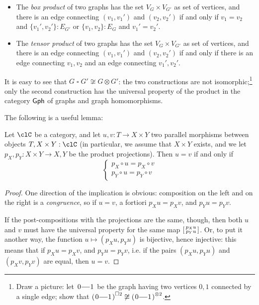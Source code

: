 \documentclass[11pt]{article}
\begin{document}
\begin{itemize}
	      \begin{itemize}
		      \item The \emph{box product} of two graphs has the set $V_G\times V_{G'}$ as set of vertices, and there is an edge connecting $(v_1,v_1')$ and $(v_2,v_2')$ if and only if $v_1=v_2$ and $\{v_1',v_2'\} :  E_{G'}$ or $\{v_1,v_2\} :  E_G$ and $v_1'=v_2'$.
		      \item The \emph{tensor product} of two graphs has the set $V_G\times V_{G'}$ as set of vertices, and there is an edge connecting $(v_1,v_1')$ and $(v_2,v_2')$ if and only if there is an edge connecting $v_1,v_2$ and an edge connecting $v_1',v_2'$.
	      \end{itemize}
	      It is easy to see that \(G \mathbin{\square} G'\not\cong G\otimes G'\): the two constructions are not isomorphic;\footnote{Draw a picture: let $\xymatrix@M=1pt@C=4mm{  0 \ar@{-}[r]& 1 }$ be the graph having two vertices $0,1$ connected by a single edge; show that $\left(\xymatrix@M=1pt@C=4mm{  0 \ar@{-}[r]& 1 }\right)^{\square 2} \not\cong \left(\xymatrix@M=1pt@C=4mm{  0 \ar@{-}[r]& 1 }\right)^{\otimes 2}$.} only the second construction has the universal property of the product in the category \({\sf Gph}\) of graphs and graph homomorphisms.
\end{itemize}
The following is a useful lemma:
\begin{lemma}\label{useful}
	Let $\clC$ be a category, and let $u,v : T \to X\times Y$ two parallel morphisms between objects $T, X\times Y : \clC$ (in particular, we assume that $X\times Y$ exists, and we let $p_X,p_Y : X\times Y\to X,Y$ be the product projections). Then $u=v$ if and only if
	\begin{equation*}
		\begin{cases}
			p_X \circ u = p_X \circ v \\
			p_Y \circ u = p_Y \circ v
		\end{cases}
	\end{equation*}
\end{lemma}
\begin{proof}
	One direction of the implication is obvious: composition on the left and on the right is a \emph{congruence}, so if $u=v$, a fortiori $p_Xu=p_Xv$, and $p_Yu=p_Yv$. 
	
	If the post-compositions with the projections are the same, though, then both $u$ and $v$ must have the universal property for the same map $\left[\begin{smallmatrix}p_Xu\\p_Yu\end{smallmatrix}\right]$. Or, to put it another way, the function $u\mapsto (p_Xu,p_Yu)$ is bijective, hence injective: this means that if $p_Xu=p_Xv$, and $p_Yu=p_Yv$, i.e. if the pairs $(p_Xu,p_Yu)$ and $(p_Xv,p_Yv)$ are equal, then $u=v$.
\end{proof}
\end{document}
